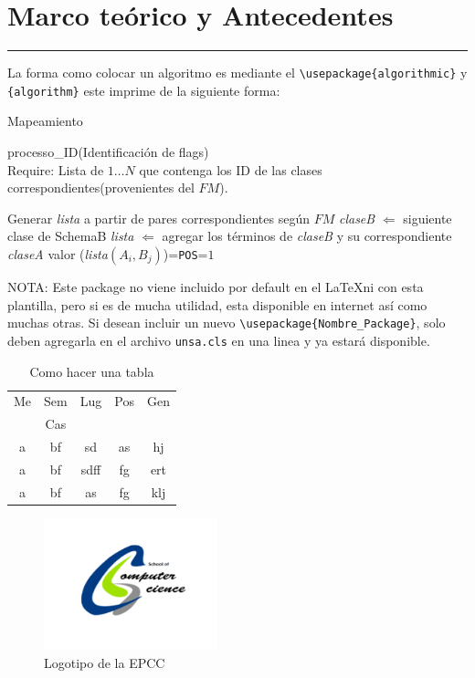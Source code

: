 \chapter{Marco teórico y Antecedentes }
\hrule \bigskip \vspace*{1cm}
La forma como colocar un algoritmo es mediante el
\verb"\usepackage{algorithmic}" y \verb"{algorithm}" este imprime de
la siguiente forma:

\bigskip
\begin{algorithm}
\caption{Mapeamiento}\label{mapeadoEVA} processo\_ID(Identificación de flags)\\
Require: Lista de ${1\ldots N}$ que contenga los ID de las clases
correspondientes(provenientes del $FM$).
\begin{algorithmic} [1]
\STATE Generar \emph{lista} a partir de pares correspondientes según
$FM$ 
\STATE
\emph{claseB} $\Longleftarrow$ siguiente clase de SchemaB \STATE
\emph{lista} $\Longleftarrow$ agregar los términos de \emph{claseB}
y su correspondiente \emph{claseA} \STATE valor
(\emph{lista$(A_{i},B_{j})$})=\verb"POS"=$1$ \ENDIF \ENDWHILE
\end{algorithmic}
\end{algorithm}

NOTA: Este package no viene incluido por default en el \LaTeX ni con
esta plantilla, pero si es de mucha utilidad, esta disponible en
internet así como muchas otras. Si desean incluir un nuevo
\verb"\usepackage{Nombre_Package}", solo deben agregarla en el
archivo \verb"unsa.cls" en una linea y ya estará disponible.

\begin{table}[h]
  \centering
  \begin{tabular}{|c|c|c|c|c|}
  \hline
  Me & Sem & Lug & Pos & Gen\\
  & Cas & & &\\
  \hline
  \hline
  a & bf & sd & as & hj \\
  a & bf & sdff & fg & ert \\
  a & bf & as & fg & klj \\
  \hline
\end{tabular}
  \caption{Como hacer una tabla}\label{tab:demo}
\end{table}


\begin{figure}
\begin{center}
\includegraphics[angle=45, width=5cm]{Graficos/escuela}
\caption{Logotipo de la EPCC}
\end{center}
\end{figure}
